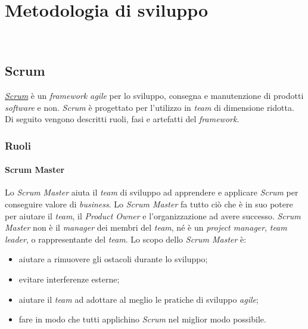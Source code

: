
\chapter{Metodologia di sviluppo}
\label{cap:metodologia-lavoro}

\\

\section{Scrum}
\label{sez:scrum}
\href{https://www.scrum.org/about}{\textit{Scrum}} è un \textit{framework} \textit{agile} per lo sviluppo, consegna e manutenzione di prodotti \textit{software} e non.
\textit{Scrum} è progettato per l'utilizzo in \textit{team} di dimensione ridotta. 
Di seguito vengono descritti ruoli, fasi e artefatti del \textit{framework}.

\subsection{Ruoli}

\subsubsection{Scrum Master}
Lo \textit{Scrum Master} aiuta il \textit{team} di sviluppo ad apprendere e applicare \textit{Scrum} per conseguire valore di \textit{business}. Lo \textit{Scrum Master} fa tutto ciò che è in suo potere per aiutare il \textit{team}, il \textit{Product Owner} e l'organizzazione ad avere successo. \textit{Scrum Master} non è il \textit{manager} dei membri del \textit{team}, né è un \textit{project manager}, \textit{team} \textit{leader}, o rappresentante del \textit{team}.
Lo scopo dello \textit{Scrum Master} è:
\begin{itemize}
    \item aiutare a rimuovere gli ostacoli durante lo sviluppo;
    \item evitare interferenze esterne;
    \item aiutare il \textit{team} ad adottare al meglio le pratiche di sviluppo \textit{agile};
    \item fare in modo che tutti applichino \textit{Scrum} nel miglior modo possibile.
\end{itemize}

